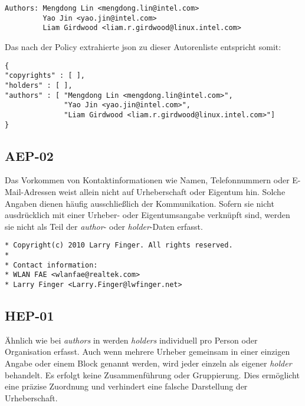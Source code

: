 \begin{lstlisting}[keepspaces=true]
Authors: Mengdong Lin <mengdong.lin@intel.com>
         Yao Jin <yao.jin@intel.com>
         Liam Girdwood <liam.r.girdwood@linux.intel.com>
\end{lstlisting}

Das nach der Policy extrahierte \gls{json} zu dieser Autorenliste entspricht somit:

\begin{lstlisting}[keepspaces=true]
{
"copyrights" : [ ],
"holders" : [ ],
"authors" : [ "Mengdong Lin <mengdong.lin@intel.com>",
              "Yao Jin <yao.jin@intel.com>",
              "Liam Girdwood <liam.r.girdwood@linux.intel.com>"]
}
\end{lstlisting}


\subsection{AEP-02}\label{subsec:aep-02}

Das Vorkommen von Kontaktinformationen wie Namen, Telefonnummern oder E-Mail-Adressen weist allein nicht auf Urheberschaft oder Eigentum hin.
Solche Angaben dienen häufig ausschließlich der Kommunikation.
Sofern sie nicht ausdrücklich mit einer Urheber- oder Eigentumsangabe verknüpft sind, werden sie nicht als Teil der \textit{author}- oder \textit{holder}-Daten erfasst.

\begin{lstlisting}[keepspaces=true]
* Copyright(c) 2010 Larry Finger. All rights reserved.
*
* Contact information:
* WLAN FAE <wlanfae@realtek.com>
* Larry Finger <Larry.Finger@lwfinger.net>
\end{lstlisting}


\subsection{HEP-01}\label{subsec:hep-01}

Ähnlich wie bei \textit{authors} in  werden \textit{holders} individuell pro Person oder Organisation erfasst.
Auch wenn mehrere Urheber gemeinsam in einer einzigen Angabe oder einem Block genannt werden, wird jeder einzeln als eigener \textit{holder} behandelt.
Es erfolgt keine Zusammenführung oder Gruppierung.
Dies ermöglicht eine präzise Zuordnung und verhindert eine falsche Darstellung der Urheberschaft.

